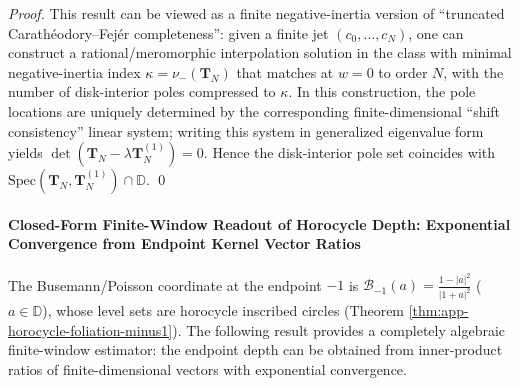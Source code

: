 \begin{proof}
This result can be viewed as a finite negative-inertia version of ``truncated Carath\'eodory--Fej\'er completeness'': given a finite jet \((c_0,\dots,c_N)\), one can construct a rational/meromorphic interpolation solution in the class with minimal negative-inertia index \(\kappa=\nu_-(\mathbf{T}_N)\) that matches at \(w=0\) to order \(N\), with the number of disk-interior poles compressed to \(\kappa\).
In this construction, the pole locations are uniquely determined by the corresponding finite-dimensional ``shift consistency'' linear system; writing this system in generalized eigenvalue form yields \(\det(\mathbf{T}_N-\lambda \mathbf{T}_N^{(1)})=0\).
Hence the disk-interior pole set coincides with \(\mathrm{Spec}(\mathbf{T}_N,\mathbf{T}_N^{(1)})\cap\mathbb{D}\). \qed
\end{proof}

\paragraph{Closed-Form Finite-Window Readout of Horocycle Depth: Exponential Convergence from Endpoint Kernel Vector Ratios}
The Busemann/Poisson coordinate at the endpoint \(-1\) is
\(
\mathcal{B}_{-1}(a)=\frac{1-|a|^2}{|1+a|^2}
\) (\(a\in\mathbb{D}\)), whose level sets are horocycle inscribed circles (Theorem \ref{thm:app-horocycle-foliation-minus1}).
The following result provides a completely algebraic finite-window estimator: the endpoint depth can be obtained from inner-product ratios of finite-dimensional vectors with exponential convergence.

